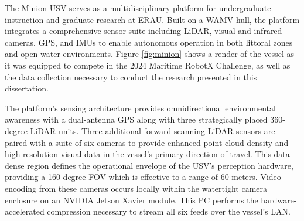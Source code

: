 \documentclass{erauthesis}
\begin{document}



The Minion \ac{USV} serves as a multidisciplinary platform for undergraduate instruction and graduate research at \ac{ERAU}.
Built on a \ac{WAMV} hull, the platform integrates a comprehensive sensor suite including \ac{LiDAR}, visual and infrared cameras, \ac{GPS}, and \acp{IMU} to enable autonomous operation in both littoral zones and open-water environments.
Figure \ref{fig:minion} shows a render of the vessel as it was equipped to compete in the 2024 Maritime RobotX Challenge, as well as the data collection necessary to conduct the research presented in this dissertation.

The platform's sensing architecture provides omnidirectional environmental awareness with a dual-antenna \ac{GPS} along with three strategically placed 360-degree \ac{LiDAR} units.
Three additional forward-scanning \ac{LiDAR} sensors are paired with a suite of six cameras to provide enhanced point cloud density and high-resolution visual data in the vessel's primary direction of travel. 
This data-dense region defines the operational envelope of the \ac{USV}'s perception hardware, providing a 160-degree \acl{FOV} which is effective to a range of 60 meters.
Video encoding from these cameras occurs locally within the watertight camera enclosure on an NVIDIA Jetson Xavier module.
This PC performs the hardware-accelerated compression necessary to stream all six feeds over the vessel's \ac{LAN}.
\end{document}
